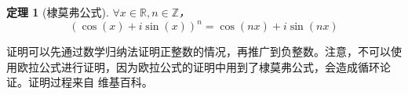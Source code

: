 \documentclass[a4paper,openany]{ctexbook}
\newtheorem{thmlevel1}{定理}
\begin{document}

\begin{thmlevel1}[棣莫弗公式]
    \(\forall x\in \mathbb{R}, n\in \mathbb{Z}\)，\[( \cos (x) + i \sin (x) )^n = \cos (nx) + i \sin (nx)\]
\end{thmlevel1}

证明可以先通过数学归纳法证明正整数的情况，再推广到负整数。注意，不可以使用欧拉公式进行证明，因为欧拉公式的证明中用到了棣莫弗公式，会造成循环论证。证明过程来自
维基百科。
\end{document}
